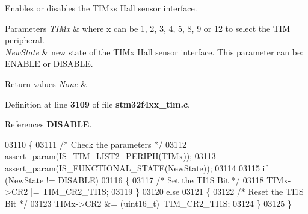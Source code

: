Enables or disables the T\+I\+Mx\textquotesingle{}s Hall sensor interface. 


\begin{DoxyParams}{Parameters}
{\em T\+I\+Mx} & where x can be 1, 2, 3, 4, 5, 8, 9 or 12 to select the T\+IM peripheral. \\
\hline
{\em New\+State} & new state of the T\+I\+Mx Hall sensor interface. This parameter can be\+: E\+N\+A\+B\+LE or D\+I\+S\+A\+B\+LE. \\
\hline
\end{DoxyParams}

\begin{DoxyRetVals}{Return values}
{\em None} & \\
\hline
\end{DoxyRetVals}


Definition at line \textbf{ 3109} of file \textbf{ stm32f4xx\+\_\+tim.\+c}.



References \textbf{ D\+I\+S\+A\+B\+LE}.


\begin{DoxyCode}
03110 \{
03111   \textcolor{comment}{/* Check the parameters */}
03112   assert_param(IS_TIM_LIST2_PERIPH(TIMx));
03113   assert_param(IS_FUNCTIONAL_STATE(NewState));
03114 
03115   \textcolor{keywordflow}{if} (NewState != DISABLE)
03116   \{
03117     \textcolor{comment}{/* Set the TI1S Bit */}
03118     TIMx->CR2 |= TIM_CR2_TI1S;
03119   \}
03120   \textcolor{keywordflow}{else}
03121   \{
03122     \textcolor{comment}{/* Reset the TI1S Bit */}
03123     TIMx->CR2 &= (uint16\_t)~TIM_CR2_TI1S;
03124   \}
03125 \}
\end{DoxyCode}
